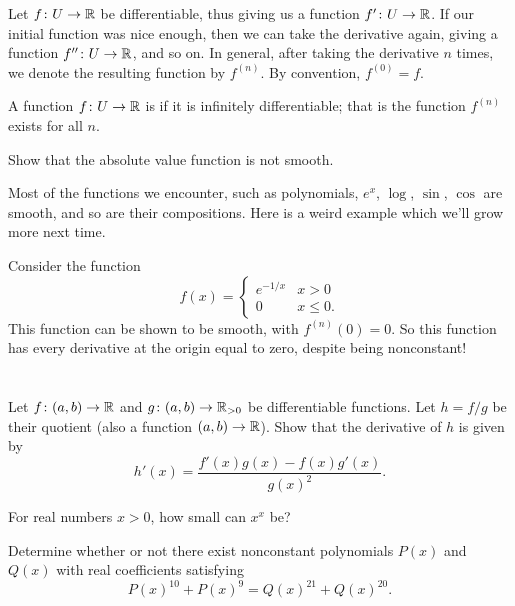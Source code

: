 Let $f \colon U \to \mathbb R$ be differentiable,
thus giving us a function $f' \colon U \to \mathbb R$.
If our initial function was nice enough,
then we can take the derivative again,
giving a function $f'' \colon U \to \mathbb R$, and so on.
In general, after taking the derivative $n$ times,
we denote the resulting function by $f^{(n)}$.
By convention, $f^{(0)} = f$.
\begin{definition}
	A function $f \colon U \to \mathbb R$ is 
	if it is infinitely differentiable;
	that is the function $f^{(n)}$ exists for all $n$.
\end{definition}
\begin{ques}
	Show that the absolute value function is not smooth.
\end{ques}

Most of the functions we encounter,
such as polynomials, $e^x$, $\log$, $\sin$, $\cos$
are smooth, and so are their compositions.
Here is a weird example which we'll grow more next time.
\begin{example}
	Consider the function
	\[ f(x) = \begin{cases}
			e^{-1/x} & x > 0 \\
			0 & x \le 0.
		\end{cases}
	\]
	This function can be shown to be smooth,
	with $f^{(n)}(0) = 0$.
	So this function has every derivative at the origin
	equal to zero, despite being nonconstant!
\end{example}

\section{\problemhead}
\begin{problem}
	Let $f \colon (a,b) \to \mathbb R$ and $g \colon (a,b) \to \mathbb R_{>0}$
	be differentiable functions.
	Let $h = f/g$ be their quotient
	(also a function $(a,b) \to \mathbb R$).
	Show that the derivative of $h$ is given by
	\[ h'(x) = \frac{f'(x) g(x) - f(x) g'(x)}{g(x)^2}. \]
\end{problem}

\begin{problem}
	For real numbers $x > 0$, how small can $x^x$ be?
\end{problem}

\begin{problem}
	[RMM 2018]
	\gim
	Determine whether or not there exist
	nonconstant polynomials $P(x)$ and $Q(x)$ with
	real coefficients satisfying
	\[ P(x)^{10} + P(x)^9 = Q(x)^{21} + Q(x)^{20}. \]
\end{problem}

